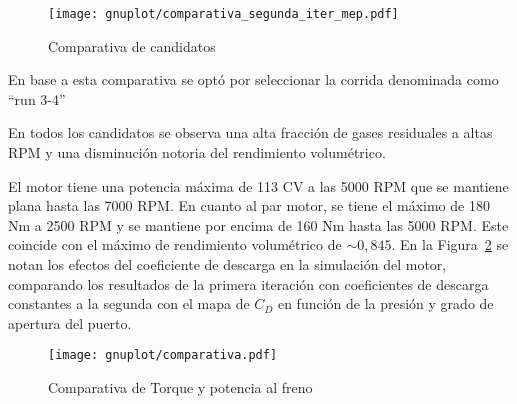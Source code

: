 \begin{figure}[h!] \centering
\texttt{[image: gnuplot/comparativa\_segunda\_iter\_mep.pdf]}
  \caption{Comparativa de candidatos} \label{fig:comparativa_segunda_iter}
\end{figure}

En base a esta comparativa se optó por seleccionar la corrida denominada como
``run 3-4''

%
%
En todos los candidatos se observa una alta fracción de gases residuales a altas
RPM y una disminución notoria del rendimiento volumétrico.

El motor tiene una potencia máxima de 113 CV a las 5000 RPM que se mantiene
plana hasta las 7000 RPM.
%
En cuanto al par motor, se tiene el máximo de 180 Nm a 2500 RPM y se mantiene
por encima de 160 Nm hasta las 5000 RPM.
%
Este coincide con el máximo de rendimiento volumétrico de $\sim 0,845$.
%
En la Figura~\ref{fig:PoTi_segunda_op} se notan los efectos del coeficiente de
descarga en la simulación del motor, comparando los resultados de la primera
iteración con coeficientes de descarga constantes a la segunda con el mapa de
$C_{D}$ en función de la presión y grado de apertura del puerto.

\begin{figure}[h!]
  \centering
  \texttt{[image: gnuplot/comparativa.pdf]}
  \caption{Comparativa de Torque y potencia al freno} \label{fig:PoTi_segunda_op}
\end{figure}
